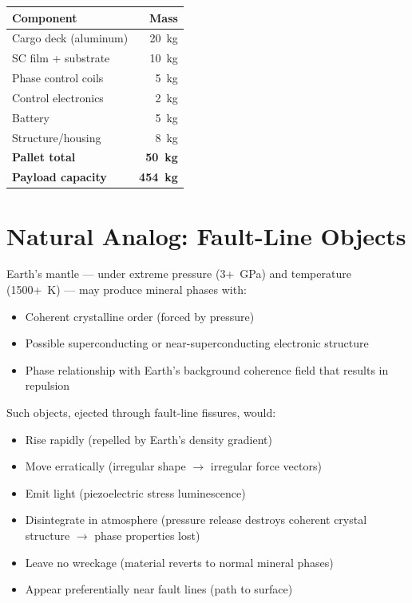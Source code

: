 \documentclass[11pt, a4paper]{article}
\begin{document}
\begin{center}
\begin{tabular}{@{}lr@{}}
\toprule
\textbf{Component} & \textbf{Mass} \\
\midrule
Cargo deck (aluminum) & 20~kg \\
SC film + substrate & 10~kg \\
Phase control coils & 5~kg \\
Control electronics & 2~kg \\
Battery & 5~kg \\
Structure/housing & 8~kg \\
\midrule
\textbf{Pallet total} & \textbf{50~kg} \\
\textbf{Payload capacity} & \textbf{454~kg} \\
\bottomrule
\end{tabular}
\end{center}

\section{Natural Analog: Fault-Line Objects}

Earth's mantle --- under extreme pressure (3+~GPa) and
temperature (1500+~K) --- may produce mineral phases with:
\begin{itemize}[nosep]
  \item Coherent crystalline order (forced by pressure)
  \item Possible superconducting or near-superconducting
        electronic structure
  \item Phase relationship with Earth's background coherence
        field that results in repulsion
\end{itemize}

Such objects, ejected through fault-line fissures, would:
\begin{itemize}[nosep]
  \item Rise rapidly (repelled by Earth's density gradient)
  \item Move erratically (irregular shape $\to$ irregular force
        vectors)
  \item Emit light (piezoelectric stress luminescence)
  \item Disintegrate in atmosphere (pressure release destroys
        coherent crystal structure $\to$ phase properties lost)
  \item Leave no wreckage (material reverts to normal mineral
        phases)
  \item Appear preferentially near fault lines (path to surface)
\end{itemize}
\end{document}
